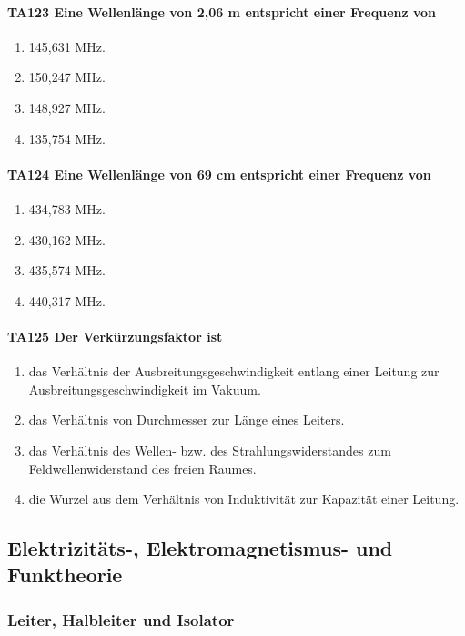 \documentclass[8pt]{article}
\begin{document}
\begin{enumerate}
\paragraph*{TA123 Eine Wellenlänge von 2,06 m entspricht einer Frequenz von}
\begin{enumerate}[nolistsep,label=\Alph*]
\item 145,631 MHz.
\item 150,247 MHz.
\item 148,927 MHz.
\item 135,754 MHz.
\end{enumerate}



\paragraph*{TA124 Eine Wellenlänge von 69 cm entspricht einer Frequenz von}
\begin{enumerate}[nolistsep,label=\Alph*]
\item 434,783 MHz.
\item 430,162 MHz.
\item 435,574 MHz.
\item 440,317 MHz.
\end{enumerate}



\paragraph*{TA125 Der Verkürzungsfaktor ist}
\begin{enumerate}[nolistsep,label=\Alph*]
\item das Verhältnis der Ausbreitungsgeschwindigkeit entlang einer Leitung zur Ausbreitungsgeschwindigkeit im Vakuum.
\item das Verhältnis von Durchmesser zur Länge eines Leiters.
\item das Verhältnis des Wellen- bzw. des Strahlungswiderstandes zum Feldwellenwiderstand des freien Raumes.
\item die Wurzel aus dem Verhältnis von Induktivität zur Kapazität einer Leitung.
\end{enumerate}


\pagebreak
\subsection{Elektrizitäts-, Elektromagnetismus- und Funktheorie}
\subsubsection{Leiter, Halbleiter und Isolator}



\end{enumerate}
\end{document}
